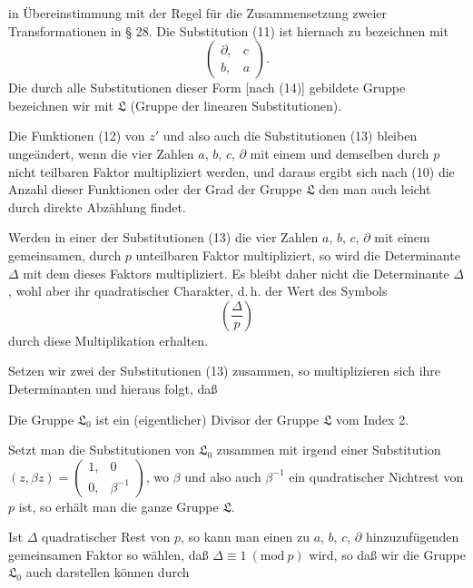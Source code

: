 in Übereinstimmung mit der Regel für die Zusammensetzung zweier Transformationen in § 28. Die Substitution (11) ist hiernach zu bezeichnen mit
\[
\begin{pmatrix} \partial, & c \\ b, & a \end{pmatrix}.
\]
Die durch alle Substitutionen dieser Form [nach (14)] gebildete Gruppe bezeichnen wir mit $\mathfrak{L}$ (Gruppe der linearen Substitutionen).

Die Funktionen (12) von $z'$ und also auch die Substitutionen (13) bleiben ungeändert, wenn die vier Zahlen $a$, $b$, $c$, $\partial$ mit einem und demselben durch $p$ nicht teilbaren Faktor multipliziert werden, und daraus ergibt sich nach (10) die Anzahl dieser Funktionen oder der Grad der Gruppe $\mathfrak{L}$
den man auch leicht durch direkte Abzählung findet.

Werden in einer der Substitutionen (13) die vier Zahlen $a$, $b$, $c$, $\partial$ mit einem gemeinsamen, durch $p$ unteilbaren Faktor multipliziert, so wird die Determinante $\Delta$ mit dem  dieses Faktors multipliziert. Es bleibt daher nicht die Determinante $\Delta$, wohl aber ihr quadratischer Charakter, d.\,h. der Wert des Symbols
\[
\left(\frac{\Delta}{p}\right)
\]
durch diese Multiplikation erhalten.

Setzen wir zwei der Substitutionen (13) zusammen, so multiplizieren sich ihre Determinanten und hieraus folgt, daß 

Die Gruppe $\mathfrak{L}_0$ ist ein (eigentlicher) Divisor der Gruppe $\mathfrak{L}$ vom Index 2.

Setzt man die Substitutionen von $\mathfrak{L}_0$ zusammen mit irgend einer Substitution $(z, \beta z) = \begin{pmatrix} 1, & 0 \\ 0, & \beta^{-1} \end{pmatrix}$, wo $\beta$ und also auch $\beta^{-1}$ ein quadratischer Nichtrest von $p$ ist, so erhält man die ganze Gruppe $\mathfrak{L}$.

Ist $\Delta$ quadratischer Rest von $p$, so kann man einen zu $a$, $b$, $c$, $\partial$ hinzuzufügenden gemeinsamen Faktor so wählen, daß $\Delta \equiv 1 \ (\mathrm{mod}\ p)$ wird, so daß wir die Gruppe $\mathfrak{L}_0$ auch darstellen können durch
